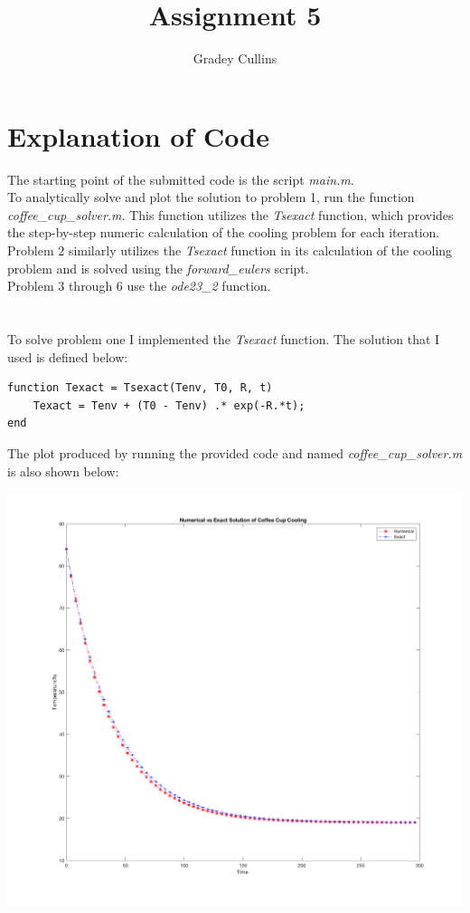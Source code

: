 \documentclass[10pt,a4paper]{article}
\author{Gradey Cullins}
\title{Assignment 5}
\begin{document}
\maketitle

\section*{Explanation of Code}
The starting point of the submitted code is the script \emph{main.m}. \\

\noindent
To analytically solve and plot the solution to problem 1, run the function \emph{coffee\_cup\_solver.m}. This function utilizes the \emph{Tsexact} function, which provides the step-by-step numeric calculation of the cooling problem for each iteration. \\

\noindent
Problem 2 similarly utilizes the \emph{Tsexact} function in its calculation of the cooling problem and is solved using the \emph{forward\_eulers} script. \\

\noindent
Problem 3 through 6 use the \emph{ode23\_2} function.

\section{}
To solve problem one I implemented the \emph{Tsexact} function. The solution that I used is defined below: \\
\begin{lstlisting}
function Texact = Tsexact(Tenv, T0, R, t)    
    Texact = Tenv + (T0 - Tenv) .* exp(-R.*t);    
end
\end{lstlisting}

\clearpage

\noindent
The plot produced by running the provided code and named \emph{coffee\_cup\_solver.m} is also shown below:

\includegraphics[scale=0.2]{num_vs_exact_cup_cool.png} \\
\end{document}
